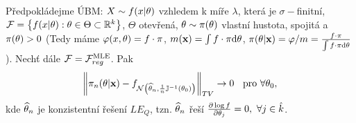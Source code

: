 \begin{theorem}
	Předpokládejme ÚBM: $X\sim f(x|\theta)$ vzhledem k míře $\lambda$, která je $\sigma-$finitní, $\mathcal{F}=\left\{ f(x|\theta):\theta\in\Theta\subset \mathbb{R}^k \right\}$, $\Theta$ otevřená, $\theta\sim\pi(\theta)$ vlastní hustota, spojitá a $\pi(\theta)>0$ (Tedy máme $\varphi(x,\theta)=f\cdot\pi$, $m(\textbf{x})=\int f\cdot \pi\mathrm{d}\theta$, $\pi(\theta|\textbf{x})=\varphi/m=\frac{f\cdot\pi}{\int f\cdot\pi\mathrm{d}\theta}$). Nechť dále $\mathcal{F}=\mathcal{F}_{reg}^{\mathrm{{\footnotesize MLE }}}$. Pak
	$$ \left\| \pi_n(\theta|\textbf{x})-f_{\mathcal{N}\left( \widehat{\theta}_n,\frac{1}{n}\mathbb{J}^{-1}(\theta_0) \right)} \right\|_{TV}\to0 \hspace{0.2cm}\text{ pro }\forall \theta_0,$$
	kde $\widehat{\theta}_n$ je konzistentní řešení $LE_Q$, tzn. $\widehat{\theta}_n$ řeší $\frac{\partial \log f}{\partial \theta_j}=0,~\forall j\in\hat{k}$.
\end{theorem}
